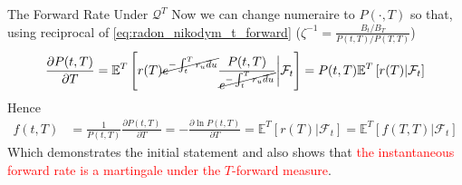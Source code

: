 \documentclass{beamer}
\begin{document}
\begin{frame}{The Forward Rate Under $\mathcal{Q}^T$}
	Now we can change numeraire to $P(\cdot,T)$ so that, using reciprocal of \cref{eq:radon_nikodym_t_forward} ($\zeta^{-1}=\frac{B_t/B_T}{P(t,T)/P(T,T)}$)
	\begin{equation*}
	\frac{\partial P(t,T)}{\partial T}=
	\mathbb{E}^T\left[r(T)\cancel{e^{-\int_t^Tr_u du}}\frac{P(t,T)}{\cancel{e^{-\int_t^Tr_u du}}}\bigg|\mathcal{F}_t\right]=
	P(t,T)\mathbb{E}^T\left[r(T)|\mathcal{F}_t\right]
	\end{equation*}
	Hence
	\begin{equation*}
	\begin{aligned}
	f(t,T)&=\frac{1}{P(t,T)}\frac{\partial P(t,T)}{\partial T}=
	-\frac{\partial \ln P(t,T)}{\partial T}
	= \mathbb{E}^T\left[r(T)|\mathcal{F}_t\right]=	\mathbb{E}^T\left[f(T,T)|\mathcal{F}_t\right]
	\end{aligned}
	\end{equation*}
	Which demonstrates the initial statement and also shows that \textcolor{red}{the instantaneous forward rate is a martingale under the $T$-forward measure}.
	
\end{frame}
\end{document}
